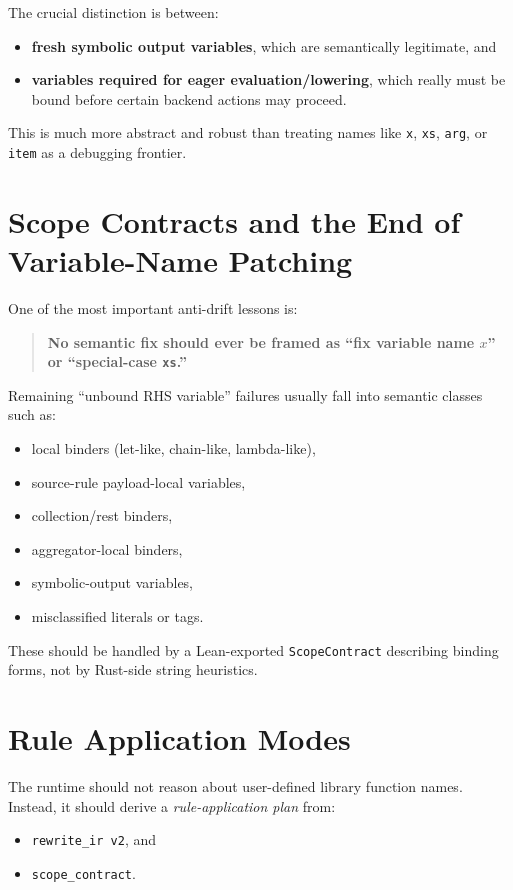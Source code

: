 \documentclass[11pt]{article}
\begin{document}
The crucial distinction is between:
\begin{itemize}
  \item \textbf{fresh symbolic output variables}, which are semantically legitimate, and
  \item \textbf{variables required for eager evaluation/lowering}, which really must be bound before certain backend actions may proceed.
\end{itemize}

This is much more abstract and robust than treating names like \texttt{x}, \texttt{xs}, \texttt{arg}, or \texttt{item} as a debugging frontier.

\section{Scope Contracts and the End of Variable-Name Patching}

One of the most important anti-drift lessons is:
\begin{quote}
\textbf{No semantic fix should ever be framed as ``fix variable name $x$'' or ``special-case \texttt{xs}.''}
\end{quote}

Remaining ``unbound RHS variable'' failures usually fall into semantic classes such as:
\begin{itemize}
  \item local binders (let-like, chain-like, lambda-like),
  \item source-rule payload-local variables,
  \item collection/rest binders,
  \item aggregator-local binders,
  \item symbolic-output variables,
  \item misclassified literals or tags.
\end{itemize}

These should be handled by a Lean-exported \texttt{ScopeContract} describing binding forms, not by Rust-side string heuristics.

\section{Rule Application Modes}

The runtime should not reason about user-defined library function names. Instead, it should derive a \emph{rule-application plan} from:
\begin{itemize}
  \item \texttt{rewrite\_ir v2}, and
  \item \texttt{scope\_contract}.
\end{itemize}
\end{document}
